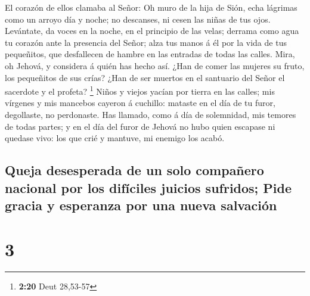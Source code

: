  El corazón de ellos clamaba al Señor: Oh muro de la hija
de Sión, echa lágrimas como un arroyo día y noche; no descanses, ni
cesen las niñas de tus ojos.  Levántate, da voces en la
noche, en el principio de las velas; derrama como agua tu corazón ante
la presencia del Señor; alza tus manos á él por la vida de tus
pequeñitos, que desfallecen de hambre en las entradas de todas las
calles.  Mira, oh Jehová, y considera á quién has hecho
así. ¿Han de comer las mujeres su fruto, los pequeñitos de sus crías?
¿Han de ser muertos en el santuario del Señor el sacerdote y el profeta?
\footnote{\textbf{2:20} Deut 28,53-57}  Niños y viejos
yacían por tierra en las calles; mis vírgenes y mis mancebos cayeron á
cuchillo: mataste en el día de tu furor, degollaste, no perdonaste.
 Has llamado, como á día de solemnidad, mis temores de
todas partes; y en el día del furor de Jehová no hubo quien escapase ni
quedase vivo: los que crié y mantuve, mi enemigo los acabó.

\hypertarget{queja-desesperada-de-un-solo-compauxf1ero-nacional-por-los-difuxedciles-juicios-sufridos-pide-gracia-y-esperanza-por-una-nueva-salvaciuxf3n}{%
\subsection{Queja desesperada de un solo compañero nacional por los
difíciles juicios sufridos; Pide gracia y esperanza por una nueva
salvación}\label{queja-desesperada-de-un-solo-compauxf1ero-nacional-por-los-difuxedciles-juicios-sufridos-pide-gracia-y-esperanza-por-una-nueva-salvaciuxf3n}}

\hypertarget{section-2}{%
\section{3}\label{section-2}}

